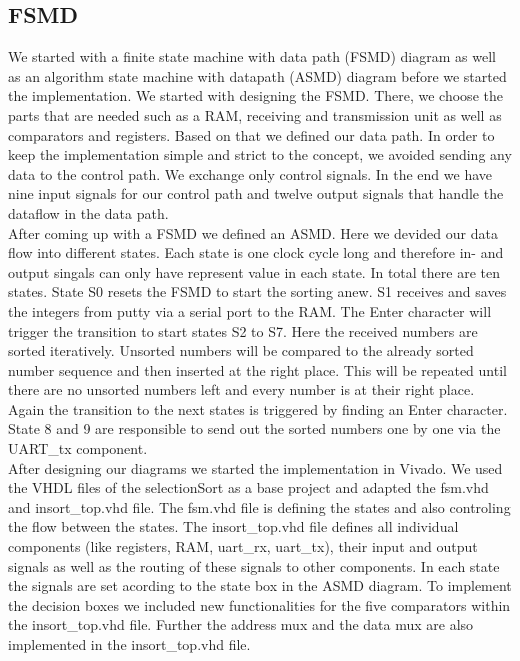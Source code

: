 \documentclass[conference]{IEEEtran}
\begin{document}
\subsection{FSMD}\label{section:fsmd}
We started with a finite state machine with data path (FSMD) diagram as well as an algorithm state machine with datapath (ASMD) diagram before we started the implementation. We started with designing the FSMD. There, we choose the parts that are needed such as a RAM, receiving and transmission unit as well as comparators and registers. Based on that we defined our data path. In order to keep the implementation simple and strict to the concept, we avoided sending any data to the control path. We exchange only control signals. In the end we have nine input signals for our control path and twelve output signals that handle the dataflow in the data path.\\
After coming up with a FSMD we defined an ASMD. Here we devided our data flow into different states. Each state is one clock cycle long and therefore in- and output singals can only have represent value in each state. In total there are ten states. State S0 resets the FSMD to start the sorting anew. S1 receives and saves the integers from putty via a serial port to the RAM. The Enter character will trigger the transition to start states S2 to S7. Here the received numbers are sorted iteratively. Unsorted numbers will be compared to the already sorted number sequence and then inserted at the right place. This will be repeated until there are no unsorted numbers left and every number is at their right place. Again the transition to the next states is triggered by finding an Enter character. State 8 and 9 are responsible to send out the sorted numbers one by one via the UART\_tx component.\\
After designing our diagrams we started the implementation in Vivado. We used the VHDL files of the selectionSort as a base project and adapted the fsm.vhd and insort\_top.vhd file. The fsm.vhd file is defining the states and also controling the flow between the states. The insort\_top.vhd file defines all individual components (like registers, RAM, uart\_rx, uart\_tx), their input and output signals as well as the routing of these signals to other components. In each state the signals are set acording to the state box in the ASMD diagram. To implement the decision boxes we included new functionalities for the five comparators within the insort\_top.vhd file. Further the address mux and the data mux are also implemented in the insort\_top.vhd file.\\
\end{document}
